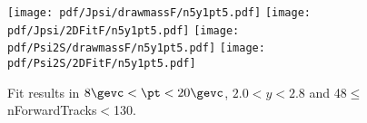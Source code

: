 \begin{figure}[H]
\begin{center}
\texttt{[image: pdf/Jpsi/drawmassF/n5y1pt5.pdf]}
\texttt{[image: pdf/Jpsi/2DFitF/n5y1pt5.pdf]}
\vspace*{-0.5cm}
\texttt{[image: pdf/Psi2S/drawmassF/n5y1pt5.pdf]}
\texttt{[image: pdf/Psi2S/2DFitF/n5y1pt5.pdf]}
\vspace*{-0.5cm}
\end{center}
\caption{Fit results in $8\gevc<\pt<20\gevc$, $2.0<y<2.8$ and 48$\leq$nForwardTracks$<$130.}
\label{Fitn5y1pt5}
\end{figure}
